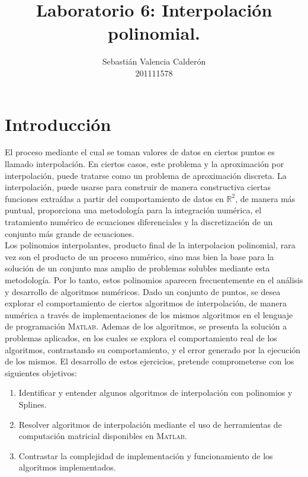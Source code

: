 \documentclass[11pt, spanish]{article}
\date{}
\begin{document}
\renewcommand\lstlistlistingname{Lista de Scripts}

\author{Sebastián Valencia Calderón \\ 201111578}
\title{Laboratorio 6: Interpolación polinomial.}
\maketitle

\section{Introducción}

El proceso mediante el cual se toman valores de datos en ciertos puntos es llamado interpolación. En ciertos casos, este problema y la aproximación por interpolación, puede tratarse como un problema de aproximación discreta. La interpolación, puede usarse para construir de manera constructiva ciertas funciones extraídas a partir del comportamiento de datos en $\mathbb{R}^2$, de manera más puntual, proporciona una metodología para la integración numérica, el tratamiento numérico de ecuaciones diferenciales y la discretización de un conjunto más grande de ecuaciones.\\

Los polinomios interpolantes, producto final de la interpolacion polinomial, rara vez son el producto de un proceso numérico, sino mas bien la base para la solución de un conjunto mas amplio de problemas solubles mediante esta metodología. Por lo tanto, estos polinomios aparecen frecuentemente en el análisis y desarrollo de algoritmos numéricos. Dado un conjunto de puntos, se desea explorar el comportamiento de ciertos algoritmos de interpolación, de manera numérica a través de implementaciones de los mismos algoritmos en el lenguaje de programación \textsc{Matlab}. Ademas de los algoritmos, se presenta la solución a problemas aplicados, en los cuales se explora el comportamiento real de los algoritmos, contrastando su comportamiento, y el error generado por la ejecución de los mismos. El desarrollo de estos ejercicios, pretende comprometerse con los siguientes objetivos:

\begin{enumerate}
\item Identificar y entender algunos algoritmos de interpolación con polinomios y Splines.
\item Resolver algoritmos de interpolación mediante el uso de herramientas de computación
matricial disponibles en \textsc{Matlab}.
\item Contrastar la complejidad de implementación y funcionamiento de los algoritmos
implementados.
\end{enumerate}
\end{document}
